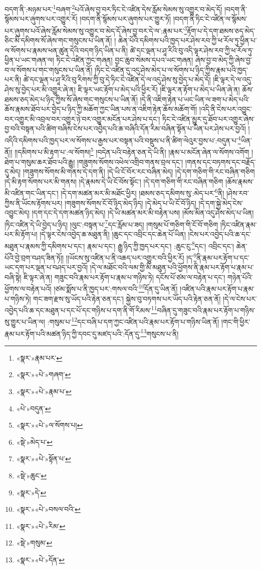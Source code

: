 བདག་ནི་:མཉམ་པར་\footnote{«སྣར་»རྣམ་པར་}བཞག་\footnote{«སྣར་»«པེ་»གཞག་}པའོ་ཞེས་བྱ་བར་ཏིང་ངེ་འཛིན་དེས་རློམ་སེམས་སུ་འགྱུར་བ་མེད་དོ། །བདག་ནི་སྙོམས་པར་ཞུགས་པར་འགྱུར་རོ། །བདག་ནི་སྙོམས་པར་ཞུགས་པར་གྱུར་ཏོ། །བདག་ནི་ཏིང་ངེ་འཛིན་ལ་སྙོམས་པར་ཞུགས་པའོ་ཞེས་རློམ་སེམས་སུ་འགྱུར་བ་མེད་དོ་ཞེས་བྱ་བར་དེ་ལ་:རྣམ་པར་\footnote{«སྣར་»«པེ་»རྣམ་པ་}རྟོག་པ་དེ་དག་ཐམས་ཅད་མེད་ཅིང་མི་དམིགས་སོ་ཞེས་གང་གསུངས་པ་ཡིན་ནོ། །
ཆེན་པོའི་དམིགས་པའི་ཁྱད་པར་ཤེས་རབ་ཀྱི་ཕ་རོལ་ཏུ་ཕྱིན་པ་ལ་སོགས་པ་རྣམས་ཕན་ཚུན་དེའི་བདག་ཉིད་ཡིན་པ་ནི། ཚེ་དང་ལྡན་པ་ཤཱ་རིའི་བུ་འདི་ལྟར་ཤེས་རབ་ཀྱི་ཕ་རོལ་ཏུ་ཕྱིན་པ་ཡང་གཞན་ལ། ཏིང་ངེ་འཛིན་ཀྱང་གཞན། བྱང་ཆུབ་སེམས་དཔའ་ཡང་གཞན། ཞེས་བྱ་བ་མེད་ཀྱི་ཞེས་བྱ་བ་ལ་སོགས་པ་གང་གསུངས་པ་ཡིན་ནོ། །ཏིང་ངེ་འཛིན་དུ་འདུ་ཤེས་མེད་པ་ལ་སོགས་པ་ཉིད་ཀྱིས་རྣམ་པའི་ཁྱད་པར་ནི། ཚེ་དང་ལྡན་པ་ཤཱ་རིའི་བུ་རིགས་ཀྱི་བུ་དེ་ཏིང་ངེ་འཛིན་དེ་ལ་འདུ་ཤེས་སུ་བྱེད་པ་མེད་དོ། །ཇི་ལྟར་དེ་ལ་འདུ་ཤེས་སུ་བྱེད་པར་མི་འགྱུར་ཞེ་ན། ཇི་ལྟར་ཡང་རྟོག་པ་མེད་པའི་ཕྱིར་རོ། །ཇི་ལྟར་ན་རྟོག་པ་མེད་པ་ཡིན་ཞེ་ན། ཆོས་ཐམས་ཅད་མེད་པ་ཉིད་ཀྱིས་སོ་ཞེས་གང་གསུངས་པ་ཡིན་ནོ། །དེ་ནི་འཇིག་རྟེན་པ་ཡང་ཡིན་ལ་ཟག་པ་མེད་པའི་ཆོས་རྣམས་ཐོབ་པར་བྱེད་པ་ཉིད་ཀྱི་མཆོག་ཀྱང་ཡིན་པས་ན་འཇིག་རྟེན་ཆོས་མཆོག་གོ། །འདི་ནི་ངེས་པར་འབྱུང་བར་འགྱུར་མི་འབྲལ་བར་འགྱུར་ཉེ་བར་འགྱུར་མངོན་པར་ཤེས་པ་དང་། ཏིང་ངེ་འཛིན་མྱུར་དུ་ཐོབ་པར་འགྱུར་ཞེས་བྱ་བའི་བསྟན་པའི་ཚིག་བཞིས་ངེས་པར་འབྱེད་པའི་ཆ་བཞིའི་དོན་རིམ་བཞིན་སྟོན་པ་ཡིན་པར་ཤེས་པར་བྱའོ། །འདིའི་དམིགས་པའི་ཁྱད་པར་ལ་སོགས་པ་རྒྱས་པར་བསྟན་པའི་བསྡུས་པ་ནི་ཚིག་ལེའུར་བྱས་པ་:བདུན་པ་\footnote{«པེ་»བདུན་}ཡིན་ནོ།། །།དམིགས་པ་མི་རྟག་པ་:ལ་སོགས།\footnote{«སྣར་»«པེ་»ལ་སོགས་པ།} །བདེན་པའི་བརྟེན་ཅན་དེ་ཡི་ནི། །རྣམ་པ་མངོན་ཞེན་ལ་སོགས་འགོག །ཐེག་པ་གསུམ་ཆར་ཐོབ་པའི་རྒྱུ། །གཟུགས་སོགས་འཕེལ་འགྲིབ་གནས་བྲལ་དང་། །གནས་དང་བཏགས་དང་བརྗོད་དུ་མེད། །གཟུགས་སོགས་མི་གནས་དེ་དག་ནི། །དེ་ཡི་ངོ་བོར་རང་བཞིན་མེད། །དེ་དག་གཅིག་གི་རང་བཞིན་གཅིག །དེ་མི་རྟག་སོགས་པར་མི་གནས། །དེ་རྣམས་དེ་ཡི་ངོ་བོས་སྟོང་། །དེ་དག་གཅིག་གི་རང་བཞིན་གཅིག །ཆོས་རྣམས་མི་འཛིན་གང་ཡིན་དང་། །དེ་དག་མཚན་མར་མི་མཐོང་ཕྱིར། །ཐམས་ཅད་དམིགས་སུ་:མེད་པར་\footnote{«སྡེ་»མེད་པ་}ནི། །ཤེས་རབ་ཀྱིས་ནི་ཡོངས་རྟོགས་པར། །གཟུགས་སོགས་ངོ་བོ་ཉིད་མེད་ཉིད། །དེ་མེད་པ་ཡི་ངོ་བོ་ཉིད། །དེ་དག་སྐྱེ་མེད་ངེས་འབྱུང་མེད། །དག་དང་དེ་དག་མཚན་ཉིད་མེད། །དེ་ཡི་མཚན་མར་མི་བརྟེན་པས། །མོས་མིན་འདུ་ཤེས་མེད་པ་ཡིན། །ཏིང་འཛིན་དེ་ཡི་བྱེད་པ་ཉིད། །ལུང་:བསྟན་པ་\footnote{«སྣར་»«པེ་»སྟོན་པ་}དང་རློམ་པ་ཟད། །གསུམ་པོ་གཅིག་གི་ངོ་བོ་གཅིག །ཏིང་འཛིན་རྣམ་པར་མི་རྟོག་པ། །དེ་ལྟར་ངེས་འབྱེད་ཆ་མཐུན་ནི། །ཆུང་དང་འབྲིང་དང་ཆེན་པོ་ཡིན། །ངེས་པར་འབྱེད་པའི་ཆ་དང་མཐུན་པ་རྣམས་ཀྱི་དམིགས་པ་དང་། རྣམ་པ་དང་། རྒྱུ་ཉིད་ཀྱི་ཁྱད་པར་དང་། :ཆུང་ངུ་\footnote{«སྡེ་»ཆུང་}དང་། འབྲིང་དང་། ཆེན་པོའི་བྱེ་བྲག་བཤད་ཟིན་ཏོ།། །།ཡོངས་སུ་འཛིན་པ་ནི་འཆད་པར་འགྱུར་བའི་ཕྱིར་རོ། །ད་\footnote{«སྣར་»དེ་}ནི་རྣམ་པར་རྟོག་པ་དང་ཡང་དག་པར་ལྡན་པ་བཤད་པར་བྱའོ། །དེ་ལ་མཐོང་བའི་ལམ་གྱི་མི་མཐུན་པའི་ཕྱོགས་ནི་རྣམ་པར་རྟོག་པ་རྣམ་པ་བཞི་སྟེ། ཇི་ལྟར་ཞེ་ན། གཟུང་བའི་རྣམ་པར་རྟོག་པ་རྣམ་པ་གཉིས་ཏེ། དངོས་པོ་ཙམ་ལ་བརྟེན་པ་དང་། གཉེན་པོའི་ཕྱོགས་ལ་བརྟེན་པའོ། །ཙམ་སྨོས་པ་ནི་ཁྱད་པར་:གསལ་བའི་\footnote{«སྣར་»«པེ་»བསལ་བའི་}དོན་དུ་ཡིན་ནོ། །འཛིན་པའི་རྣམ་པར་རྟོག་པ་རྣམ་པ་གཉིས་ཏེ། གང་ཟག་རྫས་སུ་ཡོད་པའི་རྟེན་ཅན་དང་། སྐྱེས་བུ་བཏགས་པར་ཡོད་པའི་རྟེན་ཅན་ནོ། །དེ་ལ་ངེས་པར་འབྱེད་པའི་ཆ་དང་མཐུན་པ་དང་པོ་དང་གཉིས་པ་དག་ནི་གོ་རིམས་\footnote{«སྣར་»«པེ་»རིམ་}བཞིན་དུ་གཟུང་བའི་རྣམ་པར་རྟོག་པ་གཉིས་སུ་གྱུར་པ་ཡིན་ལ། :གསུམ་པ་\footnote{«སྡེ་»གསུམ་}དང་བཞི་པ་དག་ཀྱང་འཛིན་པའི་རྣམ་པར་རྟོག་པ་གཉིས་ཡིན་ནོ། །གང་གི་ཕྱིར་རྣམ་པར་རྟོག་པའི་མཚན་ཉིད་ཀྱི་དབང་དུ་མཛད་པའི་:དོན་དུ་\footnote{«སྣར་»«པེ་»དོན་}གསུངས་པ་ནི། 